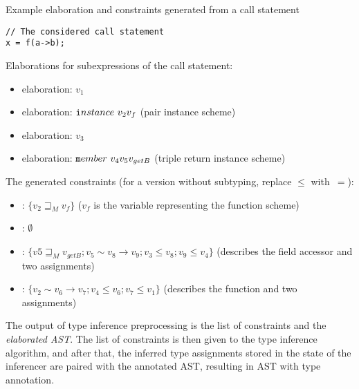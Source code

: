\begin{codex}
    \caption{Example elaboration and constraints generated from a call statement}
    \label{lst:elab}

    \begin{lstlisting}
// The considered call statement
x = f(a->b);
    \end{lstlisting}

    \begin{flushleft}
        \noindent Elaborations for subexpressions of the call statement:
    \end{flushleft}

    \begin{itemize}
        \item {} elaboration: $v_1$

        \item {} elaboration: $\mathtt{i}nstance\ v_2 v_f$ (pair instance scheme)

        \item {} elaboration: $v_3$

        \item {} elaboration: $\mathtt{m}ember\ v_4 v_5 v_{getB}$ (triple return instance scheme)
    \end{itemize}


    \begin{flushleft}
        \noindent The generated constraints (for a version without subtyping, replace $\leq$ with~$=$):
    \end{flushleft}

    \begin{itemize}
        \item {}: $\{v_2 \sqsupseteq_M v_f\}$ ($v_f$ is the variable representing the function scheme)

        \item {}: $\emptyset$

        \item {}: $\{v5 \sqsupseteq_M v_{getB}; v_5 \sim v_8 \to v_9; v_3 \leq v_8; v_9 \leq v_4\}$ (describes the field accessor and two assignments)

        \item {}: $\{v_2 \sim v_6 \to v_7; v_4 \leq v_6; v_7 \leq v_1\}$ (describes the function and two assignments)
    \end{itemize}
\end{codex}

The output of type inference preprocessing is the list of constraints and the \emph{elaborated AST}. The list of constraints is then given to the type inference algorithm, and after that, the inferred type assignments stored in the state of the inferencer are paired with the annotated AST, resulting in AST with type annotation.

